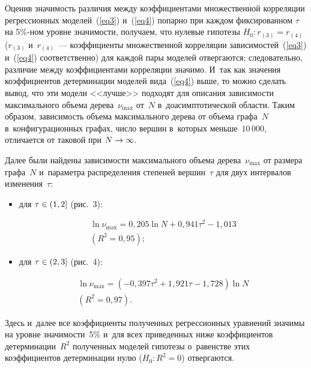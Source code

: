 \begin{multicols}{2}
Оценив значимость различия между коэффициентами множественной корреляции 
регрессионных моделей~(\ref{eq3}) и~(\ref{eq4}) попарно при каждом фиксированном 
$\tau$ на 5\%-ном уровне значимости, получаем, что нулевые гипотезы 
$H_0:r_{(3)}=r_{(4)}$ ($r_{(3)}$ и~$r_{(4)}$~--- коэффициенты множественной 
корреляции зависимостей~(\ref{eq3}) и~(\ref{eq4}) соответственно) для каждой 
пары моделей отвергаются; следовательно, различие между коэффициентами 
корреляции значимо. И~так как значения коэффициентов детерминации моделей вида~(\ref{eq4}) выше, то можно сделать вывод, что эти модели <<лучше>> 
подходят для описания зависимости максимального объема дерева~$\nu_{\max}$ от~$N$ в~доасимптотической об\-ласти.
Таким образом, зависимость объема максимального дерева от объема графа~$N$ 
в~конфигурационных графах, число вершин в~которых меньше~$10\,000$, отличается от 
таковой при $N\hm\rightarrow\infty$.

Далее были найдены зависимости максимального объема дерева~$\nu_{\max}$ от 
размера графа~$N$ и~параметра распределения степеней вершин~$\tau$ для двух 
интервалов изменения~$\tau$:
\begin{itemize}
\item для $\tau\hm\in(1,2]$ (рис.~3):

\vspace*{-2pt}

\noindent
\begin{multline}
\label{eq5}
\ln\nu_{\max} = 0{,}205\ln N + 0{,}941\tau^2 - 1{,}013 \\
\left(R^2=0{,}95\right);
\end{multline}

\item для $\tau\hm\in(2,3]$ (рис.~4):

\vspace*{-2pt}

\noindent
\begin{multline}
\label{eq6}
\ln\nu_{\max} = \left(-0{,}397\tau^2+1{,}921\tau-1{,}728\right)\ln N \\ 
\left(R^2=0{,}97\right).
\end{multline}
\end{itemize}

\vspace*{-2pt}

\noindent
Здесь и~далее все коэффициенты полученных регрессионных уравнений значимы на 
уровне значимости~5\% и~для всех приведенных ниже коэффициентов детерминации~$R^2$ 
полученных моделей гипотезы о~равенстве этих коэффициентов детерминации 
нулю ($H_0: R^2=0$) отвергаются.





\end{multicols}
